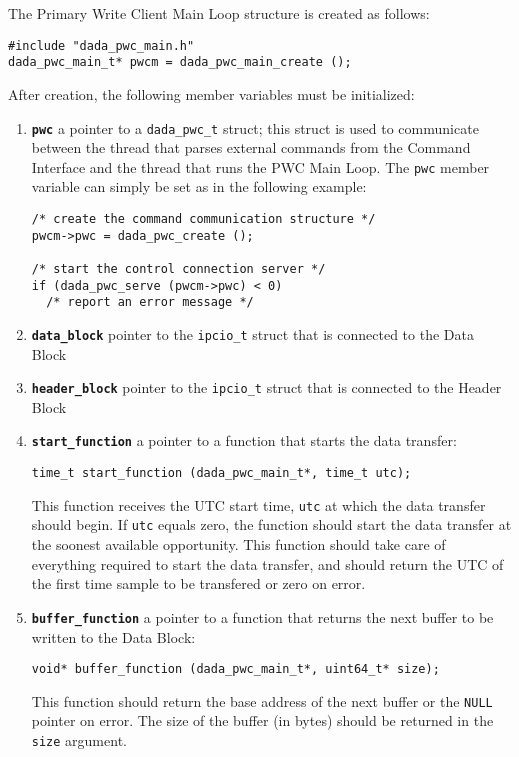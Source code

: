 The Primary Write Client Main Loop structure is created as follows:
\begin{verbatim}
#include "dada_pwc_main.h"
dada_pwc_main_t* pwcm = dada_pwc_main_create ();
\end{verbatim}
After creation, the following member variables must be initialized:
\begin{enumerate}

\item {\bf {\tt pwc}} a pointer to a {\tt dada\_pwc\_t} struct; 
   this struct is used to communicate between the thread that parses
   external commands from the Command Interface and the thread that
   runs the PWC Main Loop.  The {\tt pwc} member variable can simply
   be set as in the following example:
\begin{verbatim}
/* create the command communication structure */
pwcm->pwc = dada_pwc_create ();

/* start the control connection server */
if (dada_pwc_serve (pwcm->pwc) < 0)
  /* report an error message */
\end{verbatim}

\item {\bf {\tt data\_block}} pointer to the {\tt ipcio\_t} struct 
	that is connected to the Data Block

\item {\bf {\tt header\_block}} pointer to the {\tt ipcio\_t} struct
	that is connected to the Header Block

\item {\bf {\tt start\_function}} a pointer to a function that starts the 
  data transfer:
\begin{verbatim}
time_t start_function (dada_pwc_main_t*, time_t utc);
\end{verbatim}
  This function receives the UTC start time, {\tt utc} at which the
  data transfer should begin.  If {\tt utc} equals zero, the function
  should start the data transfer at the soonest available opportunity.
  This function should take care of everything required to start the
  data transfer, and should return the UTC of the first time sample to
  be transfered or zero on error.

\item {\bf {\tt buffer\_function}} a pointer to a function that returns
  the next buffer to be written to the Data Block:
\begin{verbatim}
void* buffer_function (dada_pwc_main_t*, uint64_t* size);
\end{verbatim}
  This function should return the base address of the next buffer or
  the {\tt NULL} pointer on error.  The size of the buffer (in bytes)
  should be returned in the {\tt size} argument.


\end{enumerate}
